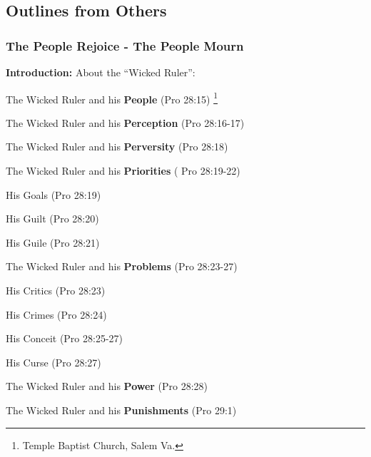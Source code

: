 \subsection{Outlines from Others}

 \subsubsection{The People Rejoice - The People Mourn}
\textbf{Introduction:} About the ``Wicked Ruler'':
\begin{compactenum}[I.][8]
	\item The Wicked Ruler and his  \textbf{People} (Pro 28:15) \footnote{Temple Baptist Church, Salem Va.}
	\item The Wicked Ruler and his  \textbf{Perception}  (Pro 28:16-17) 
	\item The Wicked Ruler and his  \textbf{Perversity}  (Pro 28:18) 
	\item The Wicked Ruler and his  \textbf{Priorities} ( Pro 28:19-22) 
	\begin{compactenum}[A.][8]
		\item His Goals  (Pro 28:19) 
		\item His  Guilt  (Pro 28:20) 
		\item His Guile  (Pro 28:21) 
	\end{compactenum}
	\item The Wicked Ruler and his  \textbf{Problems}  (Pro 28:23-27) 
	\begin{compactenum}[A.][8]
		\item His Critics  (Pro 28:23) 
		\item His Crimes  (Pro 28:24) 
		\item His Conceit  (Pro 28:25-27) 
		\item His Curse  (Pro 28:27) 
	\end{compactenum}
	\item The Wicked Ruler and his  \textbf{Power}  (Pro 28:28) 
	\item The Wicked Ruler and his  \textbf{Punishments}  (Pro 29:1) 
\end{compactenum}